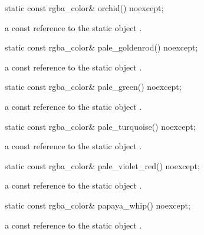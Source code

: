 \begin{itemdecl}
static const rgba_color& orchid() noexcept;
\end{itemdecl}
\begin{itemdescr}
\pnum
\returns
a const reference to the static  object .
\end{itemdescr}

\begin{itemdecl}
static const rgba_color& pale_goldenrod() noexcept;
\end{itemdecl}
\begin{itemdescr}
\pnum
\returns
a const reference to the static  object .
\end{itemdescr}

\begin{itemdecl}
static const rgba_color& pale_green() noexcept;
\end{itemdecl}
\begin{itemdescr}
\pnum
\returns
a const reference to the static  object .
\end{itemdescr}

\begin{itemdecl}
static const rgba_color& pale_turquoise() noexcept;
\end{itemdecl}
\begin{itemdescr}
\pnum
\returns
a const reference to the static  object .
\end{itemdescr}

\begin{itemdecl}
static const rgba_color& pale_violet_red() noexcept;
\end{itemdecl}
\begin{itemdescr}
\pnum
\returns
a const reference to the static  object .
\end{itemdescr}

\begin{itemdecl}
static const rgba_color& papaya_whip() noexcept;
\end{itemdecl}
\begin{itemdescr}
\pnum
\returns
a const reference to the static  object .
\end{itemdescr}

